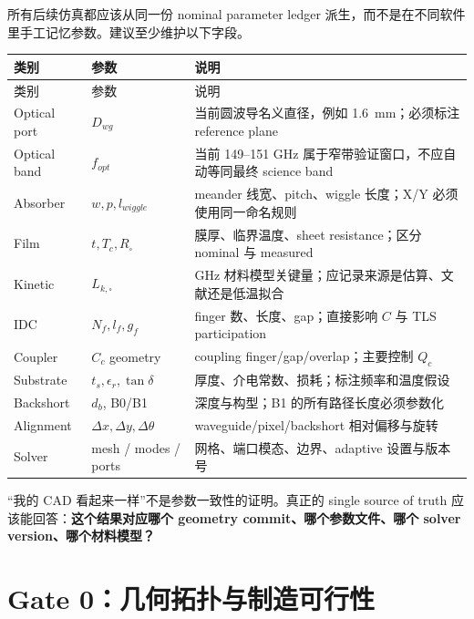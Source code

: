 \documentclass[11pt,a4paper,openany]{ctexrep}
\begin{document}
所有后续仿真都应该从同一份 nominal parameter ledger 派生，而不是在不同软件里手工记忆参数。建议至少维护以下字段。

\begin{longtable}{p{3.0cm}p{3.0cm}p{7.4cm}}
\toprule
类别 & 参数 & 说明 \\
\midrule
\endfirsthead
\toprule
类别 & 参数 & 说明 \\
\midrule
\endhead
Optical port & $D_{wg}$ & 当前圆波导名义直径，例如 \SI{1.6}{mm}；必须标注 reference plane \\
Optical band & $f_{opt}$ & 当前 149--151 GHz 属于窄带验证窗口，不应自动等同最终 science band \\
Absorber & $w,p,l_{wiggle}$ & meander 线宽、pitch、wiggle 长度；X/Y 必须使用同一命名规则 \\
Film & $t,T_c,R_\square$ & 膜厚、临界温度、sheet resistance；区分 nominal 与 measured \\
Kinetic & $L_{k,\square}$ & GHz 材料模型关键量；应记录来源是估算、文献还是低温拟合 \\
IDC & $N_f,l_f,g_f$ & finger 数、长度、gap；直接影响 $C$ 与 TLS participation \\
Coupler & $C_c$ geometry & coupling finger/gap/overlap；主要控制 $Q_c$ \\
Substrate & $t_s,\epsilon_r,\tan\delta$ & 厚度、介电常数、损耗；标注频率和温度假设 \\
Backshort & $d_b$, B0/B1 & 深度与构型；B1 的所有路径长度必须参数化 \\
Alignment & $\Delta x,\Delta y,\Delta\theta$ & waveguide/pixel/backshort 相对偏移与旋转 \\
Solver & mesh / modes / ports & 网格、端口模态、边界、adaptive 设置与版本号 \\
\bottomrule
\end{longtable}

\begin{mistakebox}
“我的 CAD 看起来一样”不是参数一致性的证明。真正的 single source of truth 应该能回答：\textbf{这个结果对应哪个 geometry commit、哪个参数文件、哪个 solver version、哪个材料模型？}
\end{mistakebox}

\section{Gate 0：几何拓扑与制造可行性}
\end{document}
